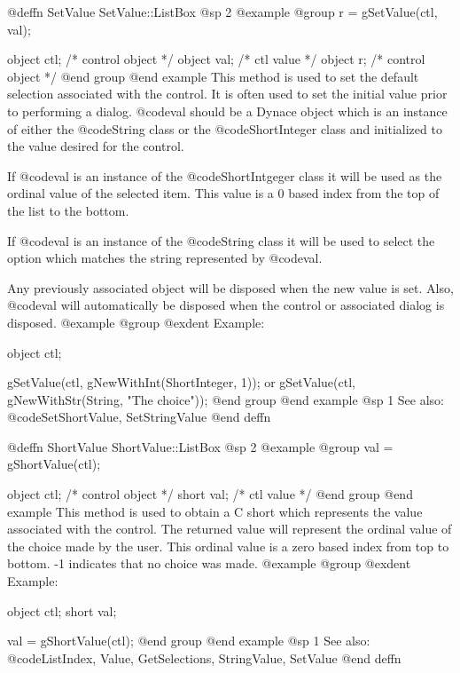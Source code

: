 @deffn {SetValue} SetValue::ListBox
@sp 2
@example
@group
r = gSetValue(ctl, val);

object  ctl;    /*  control object  */
object  val;    /*  ctl value       */
object  r;      /*  control object  */
@end group
@end example
This method is used to set the default selection associated with the
control.  It is often used to set the initial value prior to performing
a dialog.  @code{val} should be a Dynace object which is an instance of
either the @code{String} class or the @code{ShortInteger} class and
initialized to the value desired for the control.

If @code{val} is an instance of the @code{ShortIntgeger} class it will be
used as the ordinal value of the selected item.  This value is a 0 based
index from the top of the list to the bottom.

If @code{val} is an instance of the @code{String} class it will be used
to select the option which matches the string represented by @code{val}.

Any previously associated object will be disposed when the new value is set.
Also, @code{val} will automatically be disposed when the control or associated
dialog is disposed.
@example
@group
@exdent Example:

object  ctl;

gSetValue(ctl, gNewWithInt(ShortInteger, 1));
        or
gSetValue(ctl, gNewWithStr(String, "The choice"));
@end group
@end example
@sp 1
See also:  @code{SetShortValue, SetStringValue}
@end deffn













@deffn {ShortValue} ShortValue::ListBox
@sp 2
@example
@group
val = gShortValue(ctl);

object  ctl;   /*  control object  */
short   val;   /*  ctl value       */
@end group
@end example
This method is used to obtain a C short which represents the value
associated with the control.  The returned value will represent the
ordinal value of the choice made by the user.  This ordinal value is a
zero based index from top to bottom.  -1 indicates that no choice was
made.
@example
@group
@exdent Example:

object  ctl;
short   val;

val = gShortValue(ctl);
@end group
@end example
@sp 1
See also:  @code{ListIndex, Value, GetSelections, StringValue, SetValue}
@end deffn










